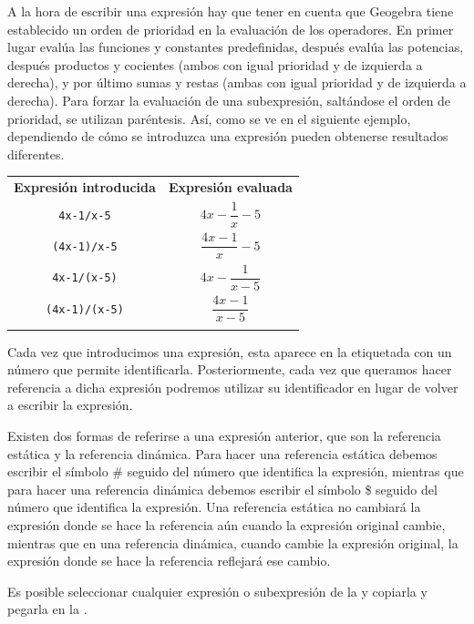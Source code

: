 A la hora de escribir una expresión hay que tener en cuenta que Geogebra tiene establecido un orden de prioridad en la evaluación de los operadores.
En primer lugar evalúa las funciones y constantes predefinidas, después evalúa las potencias, después productos y cocientes (ambos con igual prioridad y de izquierda a derecha), y por último sumas y restas (ambas con igual prioridad y de izquierda a derecha).
Para forzar la evaluación de una subexpresión, saltándose el orden de prioridad, se utilizan paréntesis.
Así, como se ve en el siguiente ejemplo, dependiendo de cómo se introduzca una expresión pueden obtenerse resultados diferentes.


\begin{center}\renewcommand{\arraystretch}{2}
\begin{tabular}{cc}
\tcrule
\textbf{Expresión introducida} & \textbf{Expresión evaluada} \\
\texttt{4x-1/x-5}              & $4x-\dfrac{1}{x}-5$         \\
\texttt{(4x-1)/x-5}            & $\dfrac{4x-1}{x}-5$         \\
\texttt{4x-1/(x-5)}            & $4x-\dfrac{1}{x-5}$         \\
\texttt{(4x-1)/(x-5)}          & $\dfrac{4x-1}{x-5}$         \\
\bcrule
\end{tabular}
\end{center}

Cada vez que introducimos una expresión, esta aparece en la  etiquetada con un número que permite identificarla.
Posteriormente, cada vez que queramos hacer referencia a dicha expresión podremos utilizar su identificador en lugar de volver a escribir la expresión.

Existen dos formas de referirse a una expresión anterior, que son la referencia estática y la referencia dinámica.
Para hacer una referencia estática debemos escribir el símbolo \# seguido del número que identifica la expresión, mientras que para hacer una referencia dinámica debemos escribir el símbolo \$ seguido del número que identifica la expresión.
Una referencia estática no cambiará la expresión donde se hace la referencia aún cuando la expresión original cambie, mientras que en una referencia dinámica, cuando cambie la expresión original, la expresión donde se hace la referencia reflejará ese cambio.

Es posible seleccionar cualquier expresión o subexpresión de la  y copiarla y pegarla en la .



